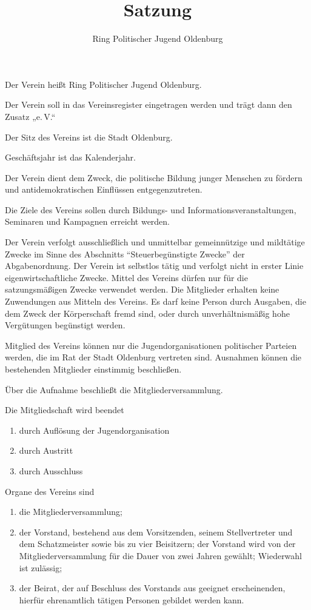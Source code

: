 \documentclass[10pt,a4paper,oneside,parskip=half]{scrartcl}
\title{Satzung}
\date{}
\author{Ring Politischer Jugend Oldenburg}
\begin{document}
\maketitle

\begin{contract}

Der Verein heißt Ring Politischer Jugend Oldenburg.

Der Verein soll in das Vereinsregister eingetragen werden und trägt dann den Zusatz „e.\,V.“

Der Sitz des Vereins ist die Stadt Oldenburg.

Geschäftsjahr ist das Kalenderjahr.

Der Verein dient dem Zweck, die politische Bildung junger Menschen zu fördern und antidemokratischen Einflüssen entgegenzutreten.

Die Ziele des Vereins sollen durch Bildungs- und Informationsveranstaltungen, Seminaren und Kampagnen erreicht werden.

Der Verein verfolgt ausschließlich und unmittelbar gemeinnützige und mildtätige Zwecke im Sinne des Abschnitts "`Steuerbegünstigte Zwecke"' der Abgabenordnung. Der Verein ist selbstlos tätig und verfolgt nicht in erster Linie eigenwirtschaftliche Zwecke. Mittel des Vereins dürfen nur für die satzungsmäßigen Zwecke verwendet werden. Die Mitglieder erhalten keine Zuwendungen aus Mitteln des Vereins. Es darf keine Person durch Ausgaben, die dem Zweck der Körperschaft fremd sind,
oder durch unverhältnismäßig hohe Vergütungen begünstigt werden.

Mitglied des Vereins können nur die Jugendorganisationen politischer Parteien werden, die im Rat der Stadt Oldenburg vertreten sind. Ausnahmen können die bestehenden Mitglieder einstimmig beschließen.

Über die Aufnahme beschließt die Mitgliederversammlung.

Die Mitgliedschaft wird beendet
\begin{enumerate}
\item durch Auflösung der Jugendorganisation
\item durch Austritt
\item durch Ausschluss
\end{enumerate}

Organe des Vereins sind
\begin{enumerate}
\item die Mitgliederversammlung;
\item der Vorstand, bestehend aus dem Vorsitzenden, seinem Stellvertreter und dem Schatzmeister sowie bis zu vier Beisitzern; der Vorstand wird von der Mitgliederversammlung für die Dauer von zwei Jahren gewählt; Wiederwahl ist zulässig;
\item der Beirat, der auf Beschluss des Vorstands aus geeignet erscheinenden, hierfür ehrenamtlich tätigen Personen gebildet werden kann. %
\end{enumerate}


\end{contract}
\end{document}
